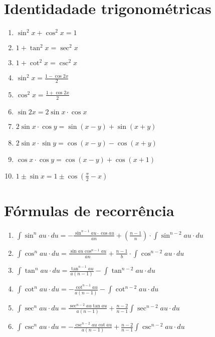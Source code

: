 \documentclass{article}
\begin{document}
  \begin{multicols*}{2}

    \section{Identidadade trigonométricas}

      \begin{enumerate}
        \item \( \sin^2{x} + \cos^2{x} = 1  \)
        \item \( 1 + \tan^2{x} = \sec^2{x}  \)
        \item \( 1+ \cot^2{x} = \csc^2{x}  \)
        \item \( \sin^2{x} = \frac{1-\cos{2x}}{2}  \)
        \item \( \cos^2{x} = \frac{1+\cos{2x}}{2}  \)
        \item \( \sin{2x} = 2 \sin{x} \cdot \cos{x}  \)
        \item \( 2 \sin{x} \cdot \cos{y} = \sin(x - y) + \sin(x + y)   \)
        \item \( 2 \sin{x} \cdot \sin{y} = \cos(x - y) - \cos(x + y)   \)
        \item \( \cos{x} \cdot \cos{y} = \cos(x - y) + \cos(x + 1)  \)
        \item \( 1 \pm \sin{x} = 1 \pm \cos(\frac{\pi}{2} - x)  \)
      \end{enumerate}

    \section{Fórmulas de recorrência}

      \begin{enumerate}
        \item \( \int \sin^n au \cdot du = -\frac{\sin^{n-1}au \cdot \cos{au}}{an} + (\frac{n-1}{n}) \cdot \int \sin^{n-2} au \cdot du \)
        \item \( \int \cos^n au \cdot du = \frac{ \sin{au} \cos^{n-1} au}{an} + \frac{n-1}{b} \cdot \int \cos^{n-2} au \cdot du \)
        \item \( \int \tan^n au \cdot du = \frac{ \tan^{n-1}{au} }{a(n-1)} - \int \tan^{n-2} au \cdot du \)
        \item \( \int \cot^n au \cdot du = -\frac{ \cot^{n-1}{au} }{a(n-1)} - \int \cot^{n-2} au \cdot du \)
        \item \( \int \sec^n au \cdot du = \frac{ \sec^{n-2}{au} \tan{au} }{a(n-1)} + \frac{n-2}{n-1} \int \sec^{n-2}  au \cdot du\)
        \item \( \int \csc^n au \cdot du = -\frac{ \csc^{n-2}{au} \cot{au}}{a(n-1)} + \frac{n-2}{n-1} \int \csc^{n-2} au \cdot du \)
      \end{enumerate}

  \end{multicols*}
\end{document}
